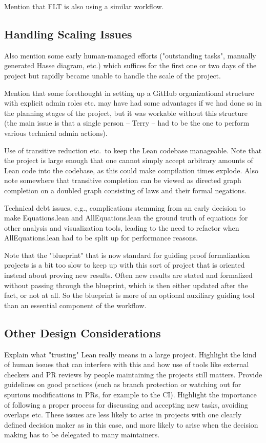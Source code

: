 Mention that FLT is also using a similar workflow.

\subsection{Handling Scaling Issues}

Also mention some early human-managed efforts ("outstanding tasks", manually generated Hasse diagram, etc.) which suffices for the first one or two days of the project but rapidly became unable to handle the scale of the project.

Mention that some forethought in setting up a GitHub organizational structure with explicit admin roles etc. may have had some advantages if we had done so in the planning stages of the project, but it was workable without this structure (the main issue is that a single person -- Terry -- had to be the one to perform various technical admin actions).

Use of transitive reduction etc.\ to keep the Lean codebase manageable. Note that the project is large enough that one cannot simply accept arbitrary amounts of Lean code into the codebase, as this could make compilation times explode. Also note somewhere that transitive completion can be viewed as directed graph completion on a doubled graph consisting of laws and their formal negations.

Technical debt issues, e.g., complications stemming from an early decision to make Equations.lean and AllEquations.lean the ground truth of equations for other analysis and visualization tools, leading to the need to refactor when AllEquations.lean had to be split up for performance reasons.

Note that the "blueprint" that is now standard for guiding proof formalization projects is a bit too slow to keep up with this sort of project that is oriented instead about proving new results. Often new results are stated and formalized without passing through the blueprint, which is then either updated after the fact, or not at all. So the blueprint is more of an optional auxiliary guiding tool than an essential component of the workflow.

\subsection{Other Design Considerations}

Explain what "trusting" Lean really means in a large project. Highlight the kind of human issues that can interfere with this and how use of tools like external checkers and PR reviews by people maintaining the projects still matters. Provide guidelines on good practices (such as branch protection or watching out for spurious modifications in PRs, for example to the CI). Highlight the importance of following a proper process for discussing and accepting new tasks, avoiding overlaps etc. These issues are less likely to arise in projects with one clearly defined decision maker as in this case, and more likely to arise when the decision making has to be delegated to many maintainers.

